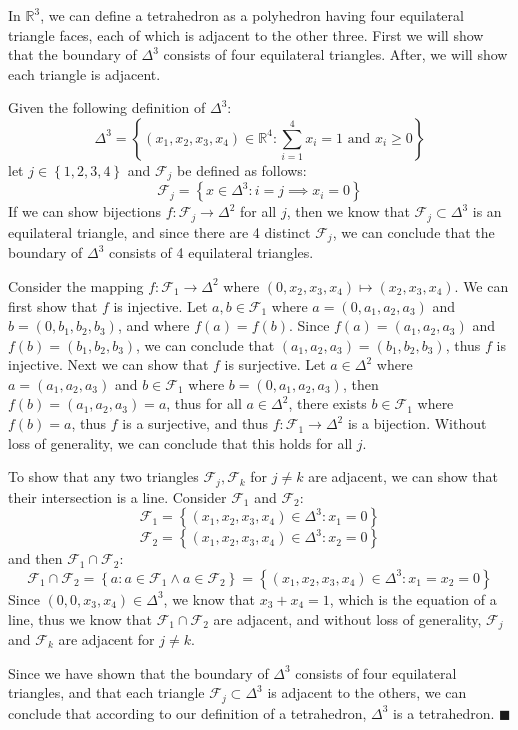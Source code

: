 \documentclass[11pt]{article}
\newcommand{\braces}[1]{\left\{#1\right\}}           %
\newcommand{\R}{\mathbb{R}}
\begin{document}
\pagestyle{fancy}
\fancyhead{}

\normalsize

In $\R^3$, we can define a tetrahedron as a polyhedron having four equilateral triangle faces, each of which is adjacent to the other three. First we will show that the boundary of $\Delta^3$ consists of four equilateral triangles. After, we will show each triangle is adjacent.

Given the following definition of $\Delta^3$:
\[\Delta^3=\braces{(x_1,x_2,x_3,x_4)\in\mathbb{R}^4:\sum_{i=1}^4x_i=1\text{ and }x_i\geq0}\]
let $j\in\braces{1,2,3,4}$ and $\mathcal{F}_j$ be defined as follows:
\[\mathcal{F}_j=\braces{x\in\Delta^3:i=j\implies x_i=0}\]
If we can show bijections $f:\mathcal{F}_j\to\Delta^2$ for all $j$, then we know that $\mathcal{F}_j\subset\Delta^3$ is an equilateral triangle, and since there are 4 distinct $\mathcal{F}_j$, we can conclude that the boundary of $\Delta^3$ consists of 4 equilateral triangles.

Consider the mapping $f:\mathcal{F}_1\to\Delta^2$ where $(0,x_2,x_3,x_4)\mapsto(x_2,x_3,x_4)$. We can first show that $f$ is injective. Let $a,b\in\mathcal{F}_1$ where $a=(0,a_1,a_2,a_3)$ and $b=(0,b_1,b_2,b_3)$, and where $f(a)=f(b)$. Since $f(a)=(a_1,a_2,a_3)$ and $f(b)=(b_1,b_2,b_3)$, we can conclude that $(a_1,a_2,a_3)=(b_1,b_2,b_3)$, thus $f$ is injective. Next we can show that $f$ is surjective. Let $a\in\Delta^2$ where $a=(a_1,a_2,a_3)$ and $b\in\mathcal{F}_1$ where $b=(0,a_1,a_2,a_3)$, then $f(b)=(a_1,a_2,a_3)=a$, thus for all $a\in\Delta^2$, there exists $b\in\mathcal{F}_1$ where $f(b)=a$, thus $f$ is a surjective, and thus $f:\mathcal{F}_1\to\Delta^2$ is a bijection. Without loss of generality, we can conclude that this holds for all $j$.

To show that any two triangles $\mathcal{F}_{j},\mathcal{F}_{k}$ for $j\ne k$ are adjacent, we can show that their intersection is a line. Consider $\mathcal{F}_1$ and $\mathcal{F}_2$:
\[\mathcal{F}_1=\braces{(x_1,x_2,x_3,x_4)\in\Delta^3:x_1=0}\]
\[\mathcal{F}_2=\braces{(x_1,x_2,x_3,x_4)\in\Delta^3:x_2=0}\]
and then $\mathcal{F}_1\cap \mathcal{F}_2$:
\[\mathcal{F}_1\cap \mathcal{F}_2=\braces{a:a\in \mathcal{F}_1\land a\in \mathcal{F}_2}=\braces{(x_1,x_2,x_3,x_4)\in\Delta^3:x_1=x_2=0}\]
Since $(0,0,x_3,x_4)\in\Delta^3$, we know that $x_3+x_4=1$, which is the equation of a line, thus we know that $\mathcal{F}_1\cap \mathcal{F}_2$ are adjacent, and without loss of generality, $\mathcal{F}_j$ and $\mathcal{F}_k$ are adjacent for $j\ne k$.

Since we have shown that the boundary of $\Delta^3$ consists of four equilateral triangles, and that each triangle $\mathcal{F}_j\subset\Delta^3$ is adjacent to the others, we can conclude that according to our definition of a tetrahedron, $\Delta^3$ is a tetrahedron. $\blacksquare$
\end{document}
